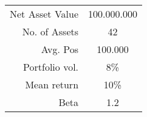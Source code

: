 \begin{tabular}{r|c}
  	Net Asset Value & 100.000.000 \\
  	No. of Assets & 42 \\
  	Avg. Pos & 100.000 \\
  	Portfolio vol. & 8\% \\
  	Mean return & 10\% \\
  	Beta & 1.2 \\
\end{tabular}